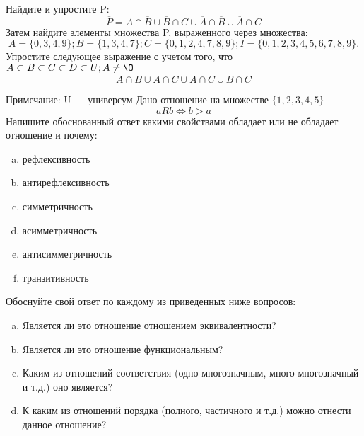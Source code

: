 \documentclass[10pt]{exam}
\begin{document}
\begin{questions}
\question
Найдите и упростите P:
\begin{equation*}
\overline{P} = A \cap \overline{B} \cup \overline{B} \cap C \cup \overline{A} \cap \overline{B} \cup \overline{A} \cap C
\end{equation*}
Затем найдите элементы множества P, выраженного через множества:
\begin{equation*}
A = \{0, 3, 4, 9\}; 
B = \{1, 3, 4, 7\};
C = \{0, 1, 2, 4, 7, 8, 9\};
I = \{0, 1, 2, 3, 4, 5, 6, 7, 8, 9\}.
\end{equation*}\question
Упростите следующее выражение с учетом того, что $A\subset B \subset C \subset D \subset U; A \neq \O$
\begin{equation*}
A \cap B \cup \overline{A} \cap \overline{C} \cup A \cap C \cup \overline{B} \cap \overline{C}
\end{equation*}

Примечание: U — универсум\question
Дано отношение на множестве $\{1, 2, 3, 4, 5\}$ 
\begin{equation*}
aRb \iff b > a
\end{equation*}
Напишите обоснованный ответ какими свойствами обладает или не обладает отношение и почему:   
\begin{enumerate} [a)]\setcounter{enumi}{0}
\item рефлексивность
\item антирефлексивность
\item симметричность
\item асимметричность
\item антисимметричность
\item транзитивность
\end{enumerate}

Обоснуйте свой ответ по каждому из приведенных ниже вопросов:
\begin{enumerate} [a)]\setcounter{enumi}{0}
    \item Является ли это отношение отношением эквивалентности?
    \item Является ли это отношение функциональным?
    \item Каким из отношений соответствия (одно-многозначным, много-многозначный и т.д.) оно является?
    \item К каким из отношений порядка (полного, частичного и т.д.) можно отнести данное отношение?
\end{enumerate}


\end{questions}
\end{document}
